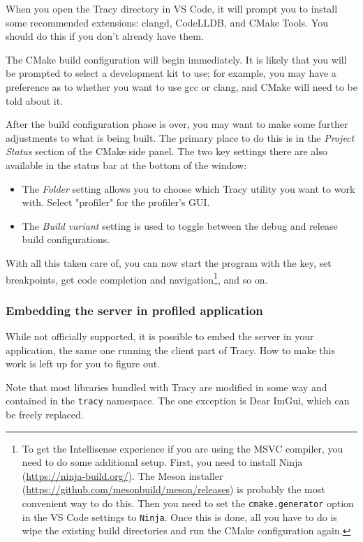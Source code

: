 \documentclass[hidelinks,titlepage,a4paper,twoside]{article}
\begin{document}
When you open the Tracy directory in VS Code, it will prompt you to install some recommended extensions: clangd, CodeLLDB, and CMake Tools. You should do this if you don't already have them.

The CMake build configuration will begin immediately. It is likely that you will be prompted to select a development kit to use; for example, you may have a preference as to whether you want to use gcc or clang, and CMake will need to be told about it.

After the build configuration phase is over, you may want to make some further adjustments to what is being built. The primary place to do this is in the \emph{Project Status} section of the CMake side panel. The two key settings there are also available in the status bar at the bottom of the window:

\begin{itemize}
\item The \emph{Folder} setting allows you to choose which Tracy utility you want to work with. Select "profiler" for the profiler's GUI.
\item The \emph{Build variant} setting is used to toggle between the debug and release build configurations.
\end{itemize}

With all this taken care of, you can now start the program with the  key, set breakpoints, get code completion and navigation\footnote{To get the Intellisense experience if you are using the MSVC compiler, you need to do some additional setup. First, you need to install Ninja (\url{https://ninja-build.org/}). The Meson installer (\url{https://github.com/mesonbuild/meson/releases}) is probably the most convenient way to do this. Then you need to set the \texttt{cmake.generator} option in the VS Code settings to \texttt{Ninja}. Once this is done, all you have to do is wipe the existing build directories and run the CMake configuration again.}, and so on.

\subsubsection{Embedding the server in profiled application}
\label{embeddingserver}

While not officially supported, it is possible to embed the server in your application, the same one running the client part of Tracy. How to make this work is left up for you to figure out.

Note that most libraries bundled with Tracy are modified in some way and contained in the \texttt{tracy} namespace. The one exception is Dear ImGui, which can be freely replaced.
\end{document}
